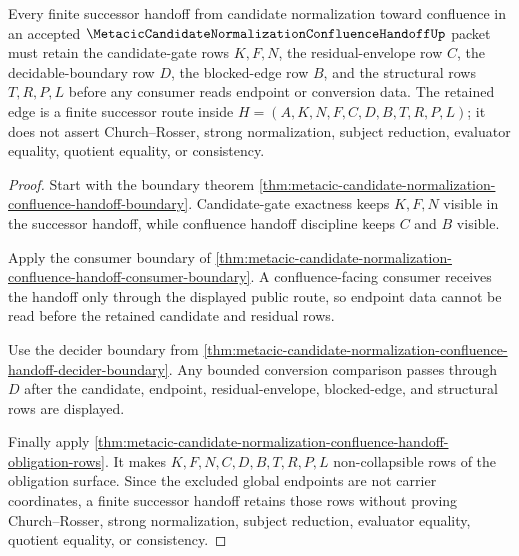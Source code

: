 \begin{theorem}
\label{thm:metacic-candidate-normalization-confluence-handoff-retained-edge}
Every finite successor handoff from candidate normalization toward confluence in an accepted $\MetacicCandidateNormalizationConfluenceHandoffUp$ packet must retain the candidate-gate rows $K,F,N$, the residual-envelope row $C$, the decidable-boundary row $D$, the blocked-edge row $B$, and the structural rows $T,R,P,L$ before any consumer reads endpoint or conversion data. The retained edge is a finite successor route inside $H=(A,K,N,F,C,D,B,T,R,P,L)$; it does not assert Church--Rosser, strong normalization, subject reduction, evaluator equality, quotient equality, or consistency.
\end{theorem}
\begin{proof}
Start with the boundary theorem \autoref{thm:metacic-candidate-normalization-confluence-handoff-boundary}. Candidate-gate exactness keeps $K,F,N$ visible in the successor handoff, while confluence handoff discipline keeps $C$ and $B$ visible.

Apply the consumer boundary of \autoref{thm:metacic-candidate-normalization-confluence-handoff-consumer-boundary}. A confluence-facing consumer receives the handoff only through the displayed public route, so endpoint data cannot be read before the retained candidate and residual rows.

Use the decider boundary from \autoref{thm:metacic-candidate-normalization-confluence-handoff-decider-boundary}. Any bounded conversion comparison passes through $D$ after the candidate, endpoint, residual-envelope, blocked-edge, and structural rows are displayed.

Finally apply \autoref{thm:metacic-candidate-normalization-confluence-handoff-obligation-rows}. It makes $K,F,N,C,D,B,T,R,P,L$ non-collapsible rows of the obligation surface. Since the excluded global endpoints are not carrier coordinates, a finite successor handoff retains those rows without proving Church--Rosser, strong normalization, subject reduction, evaluator equality, quotient equality, or consistency.
\end{proof}

